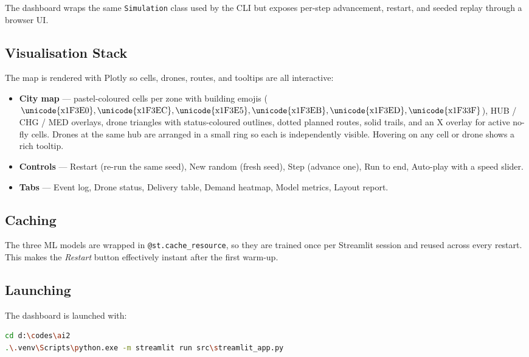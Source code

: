 \documentclass[11pt,a4paper]{article}
\begin{document}
The dashboard wraps the same \texttt{Simulation} class used by the CLI
but exposes per-step advancement, restart, and seeded replay through a
browser UI.

\subsection{Visualisation Stack}
The map is rendered with Plotly so cells, drones, routes, and tooltips
are all interactive:
\begin{itemize}[leftmargin=*]
  \item \textbf{City map} --- pastel-coloured cells per zone with
        building emojis ($\mathrm{\unicode{x1F3E0}}, \mathrm{\unicode{x1F3EC}},
        \mathrm{\unicode{x1F3E5}}, \mathrm{\unicode{x1F3EB}},
        \mathrm{\unicode{x1F3ED}}, \mathrm{\unicode{x1F33F}}$),
        HUB / CHG / MED overlays, drone triangles with status-coloured
        outlines, dotted planned routes, solid trails, and an X overlay
        for active no-fly cells. Drones at the same hub are arranged in
        a small ring so each is independently visible.
        Hovering on any cell or drone shows a rich tooltip.
  \item \textbf{Controls} --- Restart (re-run the same seed), New
        random (fresh seed), Step (advance one), Run to end, Auto-play
        with a speed slider.
  \item \textbf{Tabs} --- Event log, Drone status, Delivery table,
        Demand heatmap, Model metrics, Layout report.
\end{itemize}

\subsection{Caching}
The three ML models are wrapped in
\texttt{@st.cache\_resource}, so they are trained once per Streamlit
session and reused across every restart. This makes the
\textit{Restart} button effectively instant after the first warm-up.

\subsection{Launching}
The dashboard is launched with:
\begin{lstlisting}[language=bash, basicstyle=\ttfamily\footnotesize, frame=single, backgroundcolor=\color{codebg}]
cd d:\codes\ai2
.\.venv\Scripts\python.exe -m streamlit run src\streamlit_app.py
\end{lstlisting}
\end{document}
